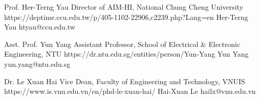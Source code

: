 
\begin{cvreferences}
  \cvreference
  {Prof. Her-Terng Yau}
  {Director of AIM-HI, National Chung Cheng University}
  {https://deptime.ccu.edu.tw/p/405-1102-22906,c2239.php?Lang=en}
  {Her-Terng Yau}
  {htyau@ccu.edu.tw}
  
  \cvreference
    {Asst. Prof. Yun Yang}
    {Assistant Professor, School of Electrical \& Electronic Engineering, NTU}
    {https://dr.ntu.edu.sg/entities/person/Yun-Yang}
    {Yun Yang}
    {yun.yang@ntu.edu.sg}


  \cvreference
    {Dr. Le Xuan Hai}
    {Vice Dean, Faculty of Engineering and Technology, VNUIS}
    {https://www.is.vnu.edu.vn/en/phd-le-xuan-hai/}
    {Hai-Xuan Le}
    {hailx@vnu.edu.vn}
\end{cvreferences}
